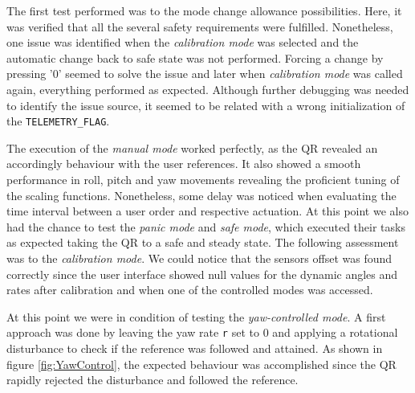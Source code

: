 \documentclass{article}
\begin{document}
The first test performed was to the mode change allowance possibilities. Here, it was verified that all the several safety requirements were fulfilled. Nonetheless, one issue was identified when the \textit{calibration mode} was selected and the automatic change back to safe state was not performed. Forcing a change by pressing '$0$' seemed to solve the issue and later when \textit{calibration mode} was called again, everything performed as expected. Although further debugging was needed to identify the issue source, it seemed to be related with a wrong initialization of the \texttt{TELEMETRY\_FLAG}.

The execution of the \textit{manual mode} worked perfectly, as the QR revealed an accordingly behaviour with the user references. It also showed a smooth performance in roll, pitch and yaw movements revealing the proficient tuning of the scaling functions. Nonetheless, some delay was noticed when evaluating the time interval between a user order and respective actuation. At this point we also had the chance to test the \textit{panic mode} and \textit{safe mode}, which executed their tasks as expected taking the QR to a safe and steady state. The following assessment was to the \textit{calibration mode}. We could notice that the sensors offset was found correctly since the user interface showed null values for the dynamic angles and rates after calibration and when one of the controlled modes was accessed.

At this point we were in condition of testing the \textit{yaw-controlled mode}. A first approach was done by leaving the yaw rate \texttt{r} set to 0 and applying a rotational disturbance to check if the reference was followed and attained. As shown in figure \ref{fig:YawControl}, the expected behaviour was accomplished since the QR rapidly rejected the disturbance and followed the reference.
\end{document}
